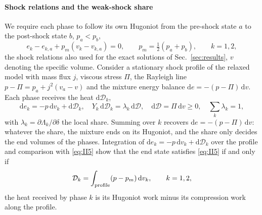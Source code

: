 \paragraph{Shock relations and the weak-shock share}
We require each phase to follow its own Hugoniot \cite{SaurelGavrilyukRenaud2003,SPB2009} from the pre-shock state $a$ to the
post-shock state $b$, $p_a<p_b$,
\begin{equation}
e_k-e_{k,a}+p_m(v_k-v_{k,a})=0,\qquad p_m=\tfrac12(p_a+p_b),\qquad k=1,2,
\label{eq:II5}
\end{equation}
the shock relations also used for the exact solutions of Sec.~\ref{sec:results}, $v$ denoting the specific volume. Consider a stationary shock profile of the
relaxed model with mass flux $j$, viscous stress $\Pi$, the Rayleigh line
$p-\Pi=p_a+j^2(v_a-v)$ and the mixture energy balance $\mathrm de=-(p-\Pi)\,\mathrm dv$. Each phase receives the heat $\mathrm d\mathcal D_k$,
\begin{equation}
\mathrm de_k=-p\,\mathrm dv_k+\mathrm d\mathcal D_k,\quad Y_k\,\mathrm d\mathcal D_k=\lambda_k\,\mathrm d\mathcal D,\quad \mathrm d\mathcal D=\Pi\,\mathrm dv\ge0,\quad \textstyle\sum_k\lambda_k=1,
\label{eq:profile}
\end{equation}
with $\lambda_k=\partial\Lambda_k/\partial\delta$ the local share. Summing over $k$ recovers $\mathrm de=-(p-\Pi)\,\mathrm dv$: whatever the share, the
mixture ends on its Hugoniot, and the share only decides the end volumes of the phases. Integration of
$\mathrm de_k=-p\,\mathrm dv_k+\mathrm d\mathcal D_k$ over the profile and comparison with \eqref{eq:II5} show that the end state satisfies \eqref{eq:II5} if and only if
\begin{equation}
\mathcal D_k=\int_{\rm profile}(p-p_m)\,\mathrm dv_k ,\qquad k=1,2,
\label{eq:heat}
\end{equation}
the heat received by phase $k$ is its Hugoniot work minus its compression work along the profile.

